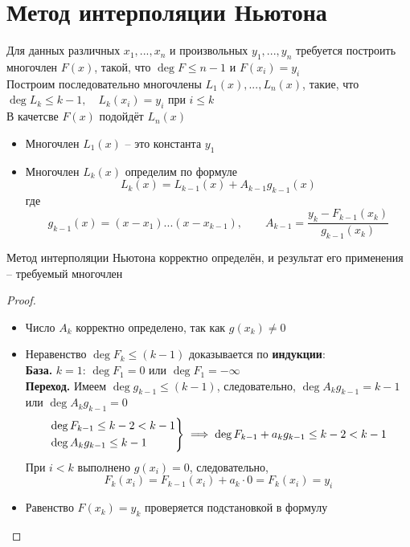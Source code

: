 \section{Метод интерполяции Ньютона}

\begin{algorithm}
	Для данных различных $x_1, ..., x_n$ и произвольных $y_1, ..., y_n$ требуется построить многочлен $F(x)$, такой, что $\deg F \le n - 1 $ и $F(x_i) = y_i $ \\
	Построим последовательно многочлены $L_1(x), ..., L_n(x)$, такие, что $\deg L_k \le k - 1, \quad L_k(x_i) = y_i$ при $i \le k$ \\
	В качетсве $F(x)$ подойдёт $L_n(x)$
	\begin{itemize}
		\item Многочлен $L_1(x)$ -- это константа $y_1$
		\item Многочлен $L_k(x)$ определим по формуле
		$$ L_k(x) = L_{k - 1}(x) + A_{k - 1}g_{k - 1}(x) $$
		где
		$$ g_{k - 1}(x) = (x - x_1)...(x - x_{k - 1}), \qquad A_{k - 1} = \frac{y_k - F_{k - 1}(x_k)}{g_{k - 1}(x_k)} $$
	\end{itemize}
\end{algorithm}

\begin{theorem}
	Метод интерполяции Ньютона корректно определён, и результат его применения -- требуемый многочлен
\end{theorem}

\begin{proof}
	\hfill
	\begin{itemize}
		\item Число $A_k$ корректно определено, так как $g(x_k) \ne 0 $
		\item Неравенство $ \deg F_k \le (k - 1)$ доказывается по \textbf{индукции}: \\
		\textbf{База.} $k = 1$: $\deg F_1 = 0$ или $ \deg F_1 = -\infty$ \\
		\textbf{Переход.} Имеем $\deg g_{k - 1} \le (k - 1)$, следовательно, $\deg A_kg_{k - 1} = k - 1$ или $\deg A_kg_{k - 1} = 0 $
		$$ \begin{rcases}
			\deg F_{k - 1} \le k - 2 < k - 1 \\
			\deg A_kg_{k - 1} \le k - 1
		\end{rcases} \implies \deg F_{k - 1} + a_kg_{k - 1} \le k - 2 < k - 1 $$
		При $i < k$ выполнено $g(x_i) = 0$, следовательно,
		$$ F_k(x_i) = F_{k - 1}(x_i) + a_k \cdot 0 = F_k(x_i) = y_i $$
		\item Равенство $F(x_k) = y_k$ проверяется подстановкой в формулу
	\end{itemize}
\end{proof}

